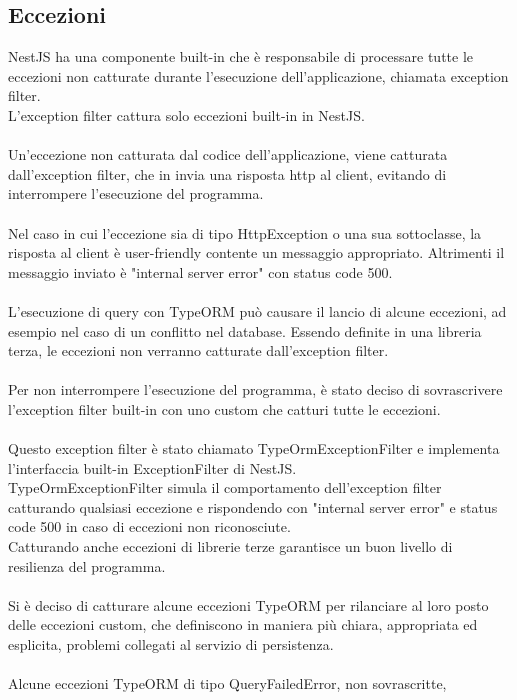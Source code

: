 \subsection{Eccezioni}
NestJS ha una componente built-in che è responsabile di processare tutte le eccezioni non catturate durante 
l'esecuzione dell'applicazione, chiamata exception filter.
\\
L'exception filter cattura solo eccezioni built-in in NestJS.
\\\\
Un'eccezione non catturata dal codice dell'applicazione, viene catturata dall'exception filter, che
 in invia una risposta \gls{http} al client, evitando di interrompere
l'esecuzione del programma.
\\\\
Nel caso in cui l'eccezione sia di tipo HttpException o una sua sottoclasse, la risposta al client è
user-friendly contente un messaggio appropriato.
Altrimenti il messaggio inviato è "internal server error" con status code 500.
\\\\
L'esecuzione di query con TypeORM può causare il lancio di alcune eccezioni, ad esempio nel caso di un conflitto nel database. 
Essendo definite in una libreria terza, le eccezioni non verranno catturate dall'exception filter.
\\\\
Per non interrompere l'esecuzione del programma,
è stato deciso di 
sovrascrivere l'exception filter built-in con uno custom che catturi tutte le eccezioni. 
\\\\
Questo exception filter è stato chiamato TypeOrmExceptionFilter e implementa l'interfaccia built-in ExceptionFilter 
di NestJS. 
\\
TypeOrmExceptionFilter simula il comportamento dell'exception filter catturando qualsiasi
eccezione e rispondendo con "internal server error" e status code 500 in caso di eccezioni non riconosciute.
\\
Catturando anche eccezioni di librerie terze garantisce un buon livello di resilienza
del programma. 
\\\\
Si è deciso di catturare alcune eccezioni TypeORM per rilanciare al loro posto delle eccezioni custom, che
definiscono in maniera più chiara, appropriata
ed esplicita, problemi collegati al servizio di persistenza.
\\\\
Alcune eccezioni TypeORM di tipo QueryFailedError, non sovrascritte, 
